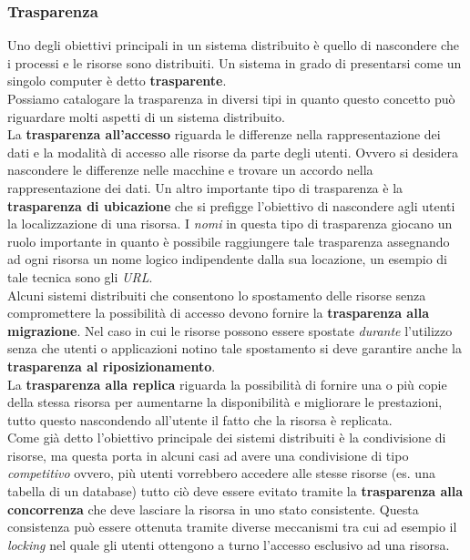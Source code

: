 \subsubsection{Trasparenza}
Uno degli obiettivi principali in  un sistema distribuito è quello di nascondere che i processi e le risorse sono distribuiti. Un sistema in grado di presentarsi come un singolo computer è detto \textbf{trasparente}.\\
Possiamo catalogare la trasparenza in diversi tipi in quanto questo concetto può riguardare molti aspetti di un sistema distribuito.\\
La \textbf{trasparenza all'accesso} riguarda le differenze nella rappresentazione dei dati e la modalità di accesso alle risorse da parte degli utenti. Ovvero si desidera nascondere le differenze nelle macchine e trovare un accordo nella rappresentazione dei dati.
Un altro importante tipo di trasparenza è la \textbf{trasparenza di ubicazione} che si prefigge l'obiettivo di nascondere agli utenti la localizzazione di una risorsa. I \emph{nomi} in questa tipo di trasparenza giocano un ruolo importante in quanto è possibile raggiungere tale trasparenza assegnando ad ogni risorsa un nome logico indipendente dalla sua locazione, un esempio di tale tecnica sono gli \emph{URL}.\\
Alcuni sistemi distribuiti che consentono lo spostamento delle risorse senza compromettere la possibilità di accesso devono fornire la \textbf{trasparenza alla migrazione}. Nel caso in cui le risorse possono essere spostate \emph{durante} l'utilizzo senza che utenti o applicazioni notino tale spostamento si deve garantire anche la \textbf{trasparenza al riposizionamento}.\\
La \textbf{trasparenza alla replica} riguarda la possibilità di fornire una o più copie della stessa risorsa per aumentarne la disponibilità e migliorare le prestazioni, tutto questo nascondendo all'utente il fatto che la risorsa è replicata.\\
Come già detto l'obiettivo principale dei sistemi distribuiti è la condivisione di risorse, ma questa porta in alcuni casi ad avere una condivisione di tipo \emph{competitivo} ovvero, più utenti vorrebbero accedere alle stesse risorse (es. una tabella di un database) tutto ciò deve essere evitato tramite la \textbf{trasparenza alla concorrenza} che deve lasciare la risorsa in uno stato consistente. Questa consistenza può essere ottenuta tramite diverse meccanismi tra cui ad esempio il \emph{locking} nel quale gli utenti ottengono a turno l'accesso esclusivo ad una risorsa.\\
